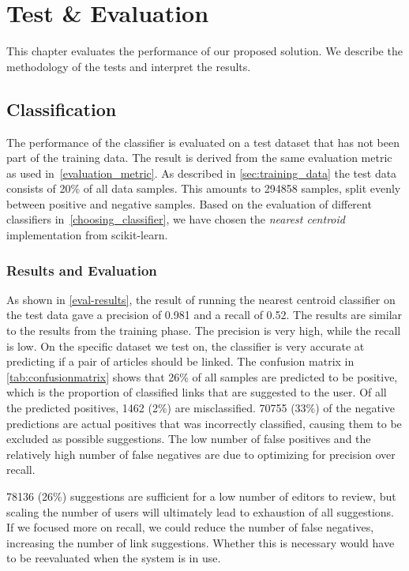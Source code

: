 \chapter{Test \& Evaluation}\label{chap:testeval}
This chapter evaluates the performance of our proposed solution. We describe the methodology of the tests and interpret the results.

\section{Classification}\label{sec:classification_evaluation}

The performance of the classifier is evaluated on a test dataset that has not been part of the training data. The result is derived from the same evaluation metric as used in~\cref{evaluation_metric}. As described in \cref{sec:training_data} the test data consists of 20\% of all data samples. This amounts to \num{294858} samples, split evenly between positive and negative samples. Based on the evaluation of different classifiers in~\cref{choosing_classifier}, we have chosen the \emph{nearest centroid} implementation from scikit-learn.

\subsection{Results and Evaluation}

As shown in \cref{eval-results}, the result of running the nearest centroid classifier on the test data gave a precision of \num{0.981} and a recall of \num{0.52}. The results are similar to the results from the training phase. The precision is very high, while the recall is low. On the specific dataset we test on, the classifier is very accurate at predicting if a pair of articles should be linked. The confusion matrix in \cref{tab:confusionmatrix} shows that 26\% of all samples are predicted to be positive, which is the proportion of classified links that are suggested to the user. Of all the predicted positives, \num{1462} (2\%) are misclassified. \num{70755} (33\%) of the negative predictions are actual positives that was incorrectly classified, causing them to be excluded as possible suggestions. The low number of false positives and the relatively high number of false negatives are due to optimizing for precision over recall. 

\num{78136} (26\%) suggestions are sufficient for a low number of editors to review, but scaling the number of users will ultimately lead to exhaustion of all suggestions. If we focused more on recall, we could reduce the number of false negatives, increasing the number of link suggestions. Whether this is necessary would have to be reevaluated when the system is in use.

